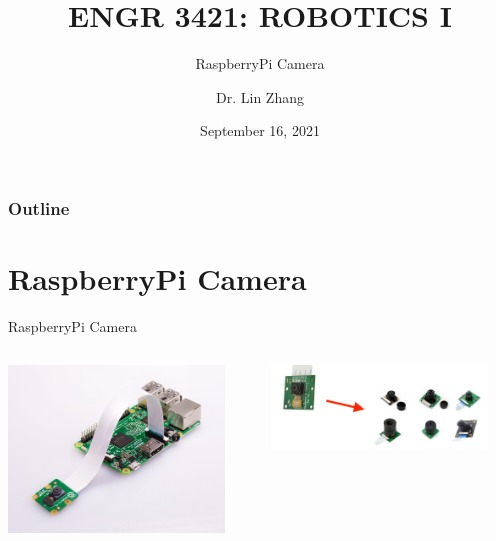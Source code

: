 \documentclass[12pt,letterpaper]{beamer}
\title[Robotics I]
{ENGR 3421: ROBOTICS I}
\subtitle{RaspberryPi Camera}
\author[Zhang, Lin]
{Dr. Lin Zhang}
\institute[UCA] %
{
  Department of Physics and Astronomy\\
  University of Central Arkansas
}
\date[Robotics1 2021] %
{September 16, 2021}
\begin{document}
\frame{\titlepage}

\begin{frame}
\frametitle{Outline}
\tableofcontents
\end{frame}

\section{RaspberryPi Camera}

\begin{frame}{RaspberryPi Camera}
    \begin{columns}
        \includegraphics[width=0.9\textwidth]{picamera_attached}

        \includegraphics[width=0.9\textwidth]{camera_variations}
    \end{columns}
\end{frame}
\end{document}

